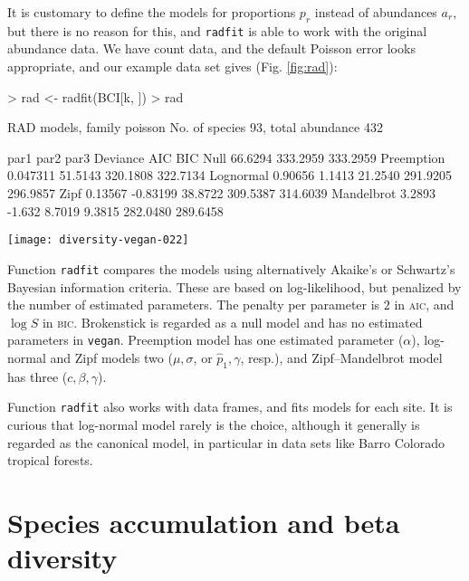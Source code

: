 \documentclass[a4paper,10pt]{amsart}
\begin{document}
It is customary to define the models for proportions $p_r$ instead of
abundances $a_r$, but there is no reason for this, and \texttt{radfit}
is able to work with the original abundance data.  We have count data,
and the default Poisson error looks appropriate, and our example data
set gives (Fig. \ref{fig:rad}):
\begin{Schunk}
\begin{Sinput}
> rad <- radfit(BCI[k, ])
> rad
\end{Sinput}
\begin{Soutput}
RAD models, family poisson 
No. of species 93, total abundance 432

           par1      par2     par3    Deviance AIC      BIC     
Null                                   66.6294 333.2959 333.2959
Preemption  0.047311                   51.5143 320.1808 322.7134
Lognormal   0.90656   1.1413           21.2540 291.9205 296.9857
Zipf        0.13567  -0.83199          38.8722 309.5387 314.6039
Mandelbrot  3.2893   -1.632    8.7019   9.3815 282.0480 289.6458
\end{Soutput}
\end{Schunk}
\begin{SCfigure}
\texttt{[image: diversity-vegan-022]}
\caption{Ranked abundance distribution models for a random plot
  (no. 50).  The best model has the lowest \textsc{aic}.}
\label{fig:rad}
\end{SCfigure}

Function \texttt{radfit} compares the models using alternatively
Akaike's or Schwartz's Bayesian information criteria.  These are based
on log-likelihood, but penalized by the number of estimated
parameters.  The penalty per parameter is $2$ in \textsc{aic}, and
$\log S$ in \textsc{bic}.  Brokenstick is regarded as a null model and
has no estimated parameters in \texttt{vegan}.  Preemption model has
one estimated parameter ($\alpha$), log-normal and Zipf models two
($\mu, \sigma$, or $\hat p_1, \gamma$, resp.), and Zipf--Mandelbrot
model has three ($c, \beta, \gamma$).

Function \texttt{radfit} also works with data frames, and fits models
for each site. It is curious that log-normal model rarely is the
choice, although it generally is regarded as the canonical model, in
particular in data sets like Barro Colorado tropical forests.

\section{Species accumulation and beta diversity}
\end{document}
